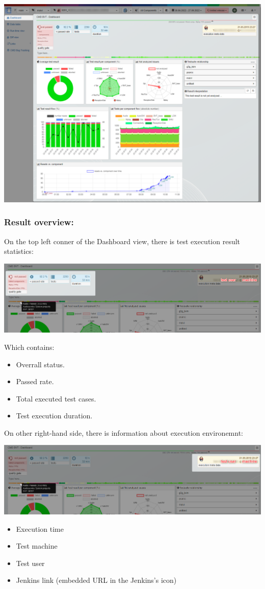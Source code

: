 \includegraphics[width=1\linewidth]{./pictures/view_dashboard.png}

\subsubsection{Result overview:}
On the top left conner of the Dashboard view, there is test execution result 
statistics:

\includegraphics[width=1\linewidth]{./pictures/dashboard/result_statistics.png}

Which contains:
\begin{itemize}
   \item Overrall status.
   \item Passed rate.
   \item Total executed test cases.
   \item Test execution duration.
\end{itemize}

On other right-hand side, there is information about execution environemnt:

\includegraphics[width=1\linewidth]{./pictures/dashboard/result_environment.png}
\begin{itemize}
   \item Execution time
   \item Test machine
   \item Test user
   \item Jenkins link (embedded URL in the Jenkins's icon)
\end{itemize}

